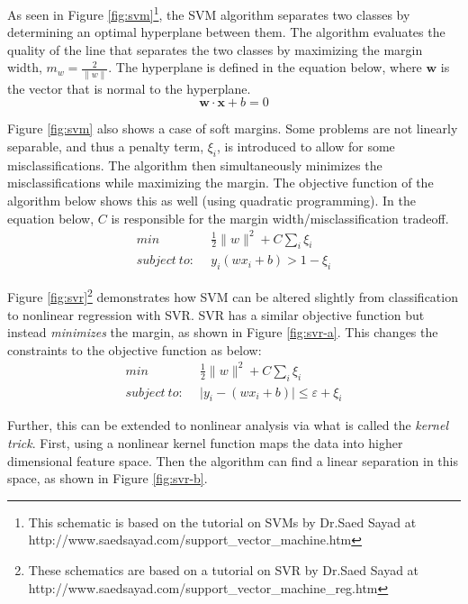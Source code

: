 As seen in Figure \ref{fig:svm}\footnote{This schematic is based on the
tutorial on SVMs by Dr.\@ Saed Sayad at
http://www.saedsayad.com/support\_vector\_machine.htm}, the \gls{SVM} algorithm
separates two classes by determining an optimal hyperplane between them.  The
algorithm evaluates the quality of the line that separates the two classes by
maximizing the margin width, $m_w = \frac{2}{\lVert w \rVert}$.  The hyperplane
is defined in the equation below, where $\boldsymbol{w}$ is the vector that is
normal to the hyperplane.  
\begin{equation}
  \boldsymbol{w \cdot x} + b = 0
\end{equation}

Figure \ref{fig:svm} also shows a case of soft margins.  Some problems are not
linearly separable, and thus a penalty term, $\xi_{i}$, is introduced to allow
for some misclassifications.  The algorithm then simultaneously minimizes the
misclassifications while maximizing the margin. The objective function of the
algorithm below shows this as well (using quadratic programming). In the
equation below, $C$ is responsible for the margin width/misclassification
tradeoff.
\begin{equation}
\begin{split}
  min\ & \frac{1}{2} \lVert w \rVert ^{2} + C \sum_{i} \xi_i \\
  subject\ to:\ \ & y_i (w x_i + b) > 1 - \xi_i
\end{split}
\end{equation}

Figure \ref{fig:svr}\footnote{These schematics are based on a tutorial on SVR
by Dr.\@ Saed Sayad at
http://www.saedsayad.com/support\_vector\_machine\_reg.htm} demonstrates how
\gls{SVM} can be altered slightly from classification to nonlinear regression
with \gls{SVR}.  \Gls{SVR} has a similar objective function but instead
\textit{minimizes} the margin, as shown in Figure \ref{fig:svr-a}. This changes
the constraints to the objective function as below:
\begin{equation}
\begin{split}
  min\ & \frac{1}{2} \lVert w \rVert ^{2} + C \sum_{i} \xi_{i} \\
  subject\ to:\ \ & \lvert y_i - (w x_i + b) \rvert \leq \varepsilon + \xi_i
\end{split}
\end{equation} 

Further, this can be extended to nonlinear analysis via what is called the
\textit{kernel trick}.  First, using a nonlinear kernel function maps the data
into higher dimensional feature space. Then the algorithm can find a linear
separation in this space, as shown in Figure \ref{fig:svr-b}.

